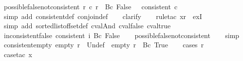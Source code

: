 \begin{isabellebody}
\isanewline
%
\endisadelimproof
\isanewline
{}\isamarkupfalse%
\ possible{\isacharunderscore}false{\isacharunderscore}not{\isacharunderscore}consistent{\isacharcolon}\ {\isachardoublequoteopen}{\isasymexists}r{\isachardot}\ c\ r\ {\isacharequal}\ {\isacharbraceleft}{\isacharbar}Bc\ False{\isacharbar}{\isacharbraceright}\ {\isasymLongrightarrow}\ {\isasymnot}\ consistent\ c{\isachardoublequoteclose}\isanewline
%
\isadelimproof
\ \ %
\endisadelimproof
%
\isatagproof
{}\isamarkupfalse%
\ {\isacharparenleft}simp\ add{\isacharcolon}\ consistent{\isacharunderscore}def\ conjoin{\isacharunderscore}def{\isacharparenright}\isanewline
\ \ \isamarkupfalse%
\ clarify\isanewline
\ \ \isamarkupfalse%
\ {\isacharparenleft}rule{\isacharunderscore}tac\ x{\isacharequal}r\ \ exI{\isacharparenright}\isanewline
\ \ \isamarkupfalse%
\ {\isacharparenleft}simp\ add{\isacharcolon}\ sorted{\isacharunderscore}list{\isacharunderscore}of{\isacharunderscore}fset{\isacharunderscore}def\ cval{\isacharunderscore}And\ cval{\isacharunderscore}false\ cval{\isacharunderscore}true{\isacharparenright}%
\endisatagproof
{\isafoldproof}%
%
\isadelimproof
\isanewline
%
\endisadelimproof
\isanewline
{}\isamarkupfalse%
\ inconsistent{\isacharunderscore}false{\isacharcolon}\ {\isachardoublequoteopen}{\isasymnot}consistent\ {\isacharparenleft}{\isasymlambda}i{\isachardot}\ {\isacharbraceleft}{\isacharbar}Bc\ False{\isacharbar}{\isacharbraceright}{\isacharparenright}{\isachardoublequoteclose}\isanewline
%
\isadelimproof
\ \ %
\endisadelimproof
%
\isatagproof
{}\isamarkupfalse%
\ possible{\isacharunderscore}false{\isacharunderscore}not{\isacharunderscore}consistent\isanewline
\ \ \isamarkupfalse%
\ simp%
\endisatagproof
{\isafoldproof}%
%
\isadelimproof
\isanewline
%
\endisadelimproof
\isanewline
{}\isamarkupfalse%
\ consistent{\isacharunderscore}empty{\isacharunderscore}{}{\isacharcolon}\ {\isachardoublequoteopen}empty\ r\ {\isacharequal}\ {\isacharbraceleft}{\isacharbar}Undef{\isacharbar}{\isacharbraceright}\ {\isasymor}\ empty\ r\ {\isacharequal}\ {\isacharbraceleft}{\isacharbar}Bc\ True{\isacharbar}{\isacharbraceright}{\isachardoublequoteclose}\isanewline
%
\isadelimproof
\ \ %
\endisadelimproof
%
\isatagproof
{}\isamarkupfalse%
\ {\isacharparenleft}cases\ r{\isacharparenright}\isanewline
\ \ \isamarkupfalse%
\ {}\isanewline
\ \ \ \ \isamarkupfalse%
\ {\isacharparenleft}case{\isacharunderscore}tac\ x{}{\isacharparenright}\isanewline

\end{isabellebody}
